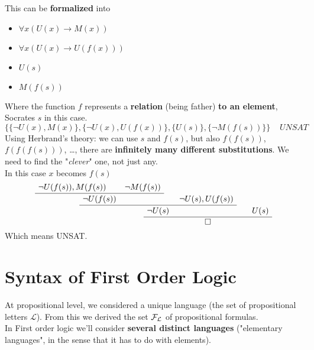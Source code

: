 This can be \textbf{formalized} into
\begin{itemize}
	\item $\forall x (U(x) \rightarrow M(x))$
	\item $\forall x (U(x) \rightarrow U(f(x)))$
	\item $U(s)$
	\\ \bline
	\item $M(f(s))$
\end{itemize}
Where the function $f$ represents a \textbf{relation} (being father) \textbf{to an element}, Socrates $s$ in this case.\\

$$ 
\{ \{\neg U(x), M(x)\}, \{\neg U(x), U(f(x))\}, \{U(s)\}, \{\neg M(f(s))\}\} \;\;\;\; UNSAT $$
Using Herbrand's theory: we can use $s$ and $f(s)$, but also $f(f(s))$, $f(f(f(s)))$, \dots, there are \textbf{infinitely many different substitutions}. We need to find the "\textit{clever}" one, not just any.\\

In this case $x$ becomes $f(s)$
$$
\AxiomC{$\neg U(f(s)), M(f(s))$}
\AxiomC{$\neg M(f(s))$}
\BinaryInfC{$\neg U(f(s))$}
\AxiomC{$\neg U(s), U(f(s))$}
\BinaryInfC{$\neg U(s)$}
\AxiomC{$U(s)$}
\BinaryInfC{$\square$}
\DisplayProof
$$
Which means UNSAT.\\


\newpage

\section{Syntax of First Order Logic}

At propositional level, we considered a unique language (the set of propositional letters $\mathcal{L}$). From this we derived the set $\mathcal{F}_\mathcal{L}$ of propositional formulas.\\

In First order logic we'll consider \textbf{several distinct languages} ("elementary languages", in the sense that it has to do with elements).\\

